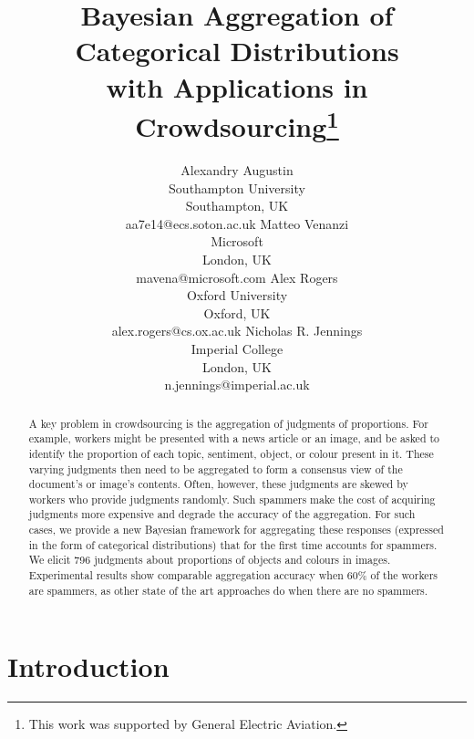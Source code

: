 \documentclass{article}
\begin{document}
\title{Bayesian Aggregation of Categorical Distributions\\with Applications in Crowdsourcing\thanks{This work was supported by General Electric Aviation.}}

\author{
Alexandry Augustin \\
Southampton University\\ 
Southampton, UK \\ 
aa7e14@ecs.soton.ac.uk
\And 
Matteo Venanzi \\ 
Microsoft \\
London, UK \\ 
mavena@microsoft.com
\And 
Alex Rogers \\ 
Oxford University \\
Oxford, UK \\ 
alex.rogers@cs.ox.ac.uk
\And 
Nicholas R. Jennings \\ 
Imperial College \\
London, UK \\ 
n.jennings@imperial.ac.uk
}

\maketitle
\begin{abstract}
A key problem in crowdsourcing is the aggregation of judgments of
proportions. For example, workers might be presented with a news
article or an image, and be asked to identify the proportion of
each topic, sentiment, object, or colour present in it. These
varying judgments then need to be aggregated to form a consensus
view of the document's or image's contents. Often, however, these
judgments are skewed by workers who provide judgments randomly.
Such spammers make the cost of acquiring judgments more expensive
and degrade the accuracy of the aggregation. For such cases, we
provide a new Bayesian framework for aggregating these responses
(expressed in the form of categorical distributions) that for the
first time accounts for spammers. We elicit 796 judgments
about proportions of objects and colours in images. Experimental
results show comparable aggregation accuracy when 60\% of the workers
are spammers, as other state of the art approaches do when there are
no spammers.
\end{abstract}


\section{Introduction}
\end{document}
